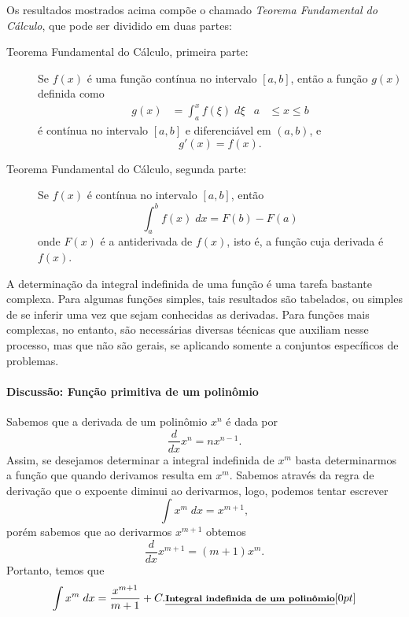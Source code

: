 Os resultados mostrados acima compõe o chamado \emph{Teorema Fundamental do Cálculo}, que pode ser dividido em duas partes:
\begin{description}
  \item[Teorema Fundamental do Cálculo, primeira parte:] Se $f(x)$ é uma função contínua no intervalo $[a,b]$, então a função $g(x)$ definida como
  \begin{align}
    g(x) &= \int_a^x f(\xi) \;d\xi & a&\leq x \leq b
  \end{align}
  é contínua no intervalo $[a,b]$ e diferenciável em $(a,b)$, e
  \begin{equation}
    g'(x) = f(x).
  \end{equation}
  \item[Teorema Fundamental do Cálculo, segunda parte:] Se $f(x)$ é contínua no intervalo $[a,b]$, então
  \begin{equation}
    \int_a^b f(x) \; dx = F(b) - F(a)
  \end{equation}
  onde $F(x)$ é a antiderivada de $f(x)$, isto é, a função cuja derivada é $f(x)$.
\end{description}

A determinação da integral indefinida de uma função é uma tarefa bastante complexa. Para algumas funções simples, tais resultados são tabelados, ou simples de se inferir uma vez que sejam conhecidas as derivadas. Para funções mais complexas, no entanto, são necessárias diversas técnicas que auxiliam nesse processo, mas que não são gerais, se aplicando somente a conjuntos específicos de problemas.

\paragraph{Discussão: Função primitiva de um polinômio}

Sabemos que a derivada de um polinômio $x^n$ é dada por
\begin{equation}
    \frac{d}{dx} x^n = n x^{n-1}.
\end{equation}
%
Assim, se desejamos determinar a integral indefinida de $x^m$ basta determinarmos a função que quando derivamos resulta em $x^m$. Sabemos através da regra de derivação que o expoente diminui ao derivarmos, logo, podemos tentar escrever
\begin{equation}
    \int x^{m} \;dx = x^{m+1},
\end{equation}
%
porém sabemos que ao derivarmos $x^{m+1}$ obtemos
\begin{equation}
    \frac{d}{dx} x^{m+1} = (m+1) x^{m}.
\end{equation}
%
Portanto, temos que  
\begin{equation}\label{Eq:IntegralIndefinidaDeUmPolinomio}
    \int x^{m} \;dx = \frac{x^{m+1}}{m+1} + C. \relax{\footnotesize\emph{\textbf{Integral indefinida de um polinômio}}}[0pt]
\end{equation}

